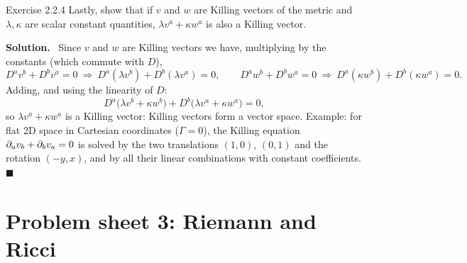 \documentclass[11pt,a4paper]{article}
\numberwithin{equation}{subsection}
\newenvironment{solution}{\par\noindent\textbf{\textcolor{excol!70!black}{Solution.}}\ }{\hfill$\blacksquare$\par\medskip}
\newcommand{\added}[1]{{\color{teal!60!black}#1}}
\begin{document}
\begin{problem}{Exercise 2.2.4}
Lastly, show that if $v$ and $w$ are Killing vectors of the metric and $\lambda,\kappa$ are scalar constant quantities, $\lambda v^a+\kappa w^a$ is also a Killing vector.
\end{problem}
\begin{solution}
Since $v$ and $w$ are Killing vectors we have, multiplying by the constants (which commute with $D$),
\[
  D^av^b+D^bv^a=0\ \Rightarrow\ D^a(\lambda v^b)+D^b(\lambda v^a)=0,\qquad
  D^aw^b+D^bw^a=0\ \Rightarrow\ D^a(\kappa w^b)+D^b(\kappa w^a)=0 .
\]
Adding, and using the linearity of $D$:
\[
  D^a\big(\lambda v^b+\kappa w^b\big)+D^b\big(\lambda v^a+\kappa w^a\big)=0 ,
\]
so $\lambda v^a+\kappa w^a$ is a Killing vector: Killing vectors form a vector space. \added{Example: for flat 2D space in Cartesian coordinates ($\Gamma=0$), the Killing equation $\partial_av_b+\partial_bv_a=0$ is solved by the two translations $(1,0)$, $(0,1)$ and the rotation $(-y,x)$, and by all their linear combinations with constant coefficients.}
\end{solution}

\section{Problem sheet 3: Riemann and Ricci}
\end{document}
